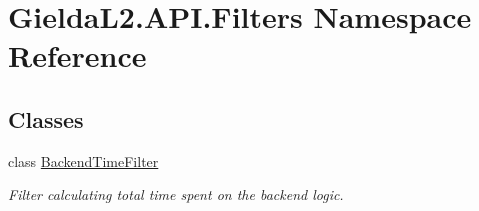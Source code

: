 \hypertarget{namespace_gielda_l2_1_1_a_p_i_1_1_filters}{}\section{Gielda\+L2.\+A\+P\+I.\+Filters Namespace Reference}
\label{namespace_gielda_l2_1_1_a_p_i_1_1_filters}
\subsection*{Classes}
\begin{DoxyCompactItemize}
\item 
class \mbox{\hyperlink{class_gielda_l2_1_1_a_p_i_1_1_filters_1_1_backend_time_filter}{Backend\+Time\+Filter}}
\begin{DoxyCompactList}\small\item\em Filter calculating total time spent on the backend logic. \end{DoxyCompactList}\end{DoxyCompactItemize}
